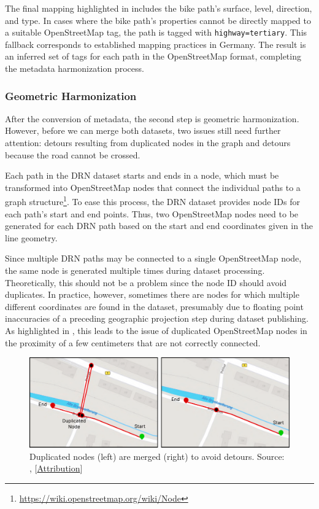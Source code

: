The final mapping highlighted in  includes the bike path's surface, level, direction, and type. In cases where the bike path's properties cannot be directly mapped to a suitable OpenStreetMap tag, the path is tagged with \texttt{highway=tertiary}. This fallback corresponds to established mapping practices in Germany. The result is an inferred set of tags for each path in the OpenStreetMap format, completing the metadata harmonization process.

\subsubsection{Geometric Harmonization}\label{sec:maxlorenz2}

After the conversion of metadata, the second step is geometric harmonization. However, before we can merge both datasets, two issues still need further attention: detours resulting from duplicated nodes in the graph and detours because the road cannot be crossed. 

Each path in the DRN dataset starts and ends in a node, which must be transformed into OpenStreetMap nodes that connect the individual paths to a graph structure\footnote{\url{https://wiki.openstreetmap.org/wiki/Node}}. To ease this process, the DRN dataset provides node IDs for each path's start and end points. Thus, two OpenStreetMap nodes need to be generated for each DRN path based on the start and end coordinates given in the line geometry. 

Since multiple DRN paths may be connected to a single OpenStreetMap node, the same node is generated multiple times during dataset processing. Theoretically, this should not be a problem since the node ID should avoid duplicates. In practice, however, sometimes there are nodes for which multiple different coordinates are found in the dataset, presumably due to floating point inaccuracies of a preceding geographic projection step during dataset publishing. As highlighted in , this leads to the issue of duplicated OpenStreetMap nodes in the proximity of a few centimeters that are not correctly connected.

\begin{figure}[t]
\centering
\includegraphics[width=\linewidth]{images/node-merging.pdf}
\caption{Duplicated nodes (left) are merged (right) to avoid detours. Source: \cite{lorenz_2022}, [\hyperref[attribution]{Attribution}]}
\label{fig:node-merging}
\end{figure}

